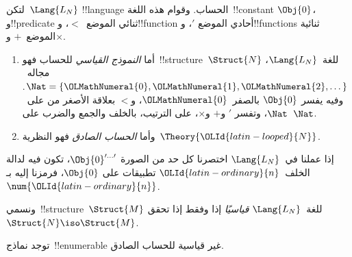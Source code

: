 \documentclass[../../../include/open-logic-section]{subfiles}
\begin{document}

\begin{defn}
لتكن~$\Lang{L_N}$ !!{language} الحساب. وقوام هذه اللغة~!!{constant}
$\Obj{0}$، و!!{predicate} ثنائي الموضع~$<$، و!!{function} أحادي الموضع
$\prime$، و!!{function}s ثنائية الموضع~$+$ و$\times$.
\begin{enumerate}
\item أما \emph{النموذج القياسي} للحساب فهو~!!{structure}~$\Struct{N}$
  للغة~$\Lang{L_N}$، مجاله~$\Nat = \{ {\OLMathNumeral{0}}, {\OLMathNumeral{1}}, {\OLMathNumeral{2}}, \dots\}$. وفيه يفسر
  $\Obj{0}$ بالصفر~${\OLMathNumeral{0}}$، و$<$ بعلاقة الأصغر من على~$\Nat$، وتفسر
  $\prime$ و$+$ و$\times$، على الترتيب، بالخلف والجمع والضرب على~$\Nat$.
\item وأما \emph{الحساب الصادق} فهو النظرية~$\Theory{{\OLId{latin-looped}{N}}}$.
\end{enumerate}
\end{defn}

إذا عملنا في~$\Lang{L_N}$ اختصرنا كل حد من الصورة
$\Obj{0}^{\prime\dots\prime}$، تكون فيه لدالة الخلف~${\OLId{latin-ordinary}{n}}$ تطبيقات على
$\Obj{0}$، فرمزنا إليه بـ~$\num{{\OLId{latin-ordinary}{n}}}$.

\begin{defn}
ونسمي~!!{structure}~$\Struct{M}$ للغة~$\Lang{L_N}$ \emph{قياسيًا} إذا
وفقط إذا تحقق~$\Struct{N} \iso \Struct{M}$.
\end{defn}

\begin{thm}
توجد نماذج~!!{enumerable} غير قياسية للحساب الصادق.
\end{thm}
\end{document}
